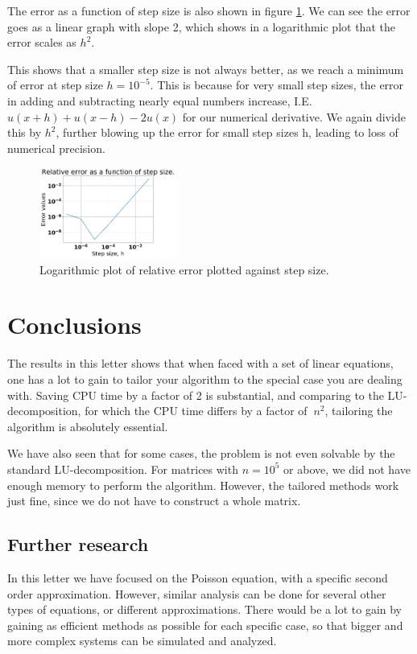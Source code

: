 \documentclass{emulateapj}
\begin{document}
The error as a function of step size is also shown in figure \ref{fig:3}. We can see the error goes as a linear graph with slope 2, which shows in a logarithmic plot that the error scales as $h^2$.

This shows that a smaller step size is not always better, as we reach a minimum of error at step size $h=10^{-5}$. This is because for very small step sizes, the error in adding and subtracting nearly equal numbers increase, I.E. $u(x+h)+u(x-h)-2u(x)$ for our numerical derivative. We again divide this by $h^2$, further blowing up the error for small step sizes h, leading to loss of numerical precision. 

\begin{figure}[H]
    \centering
    \includegraphics[width=0.4\textwidth]{images/RelativeError.png}
    \caption{Logarithmic plot of relative error plotted against step size.}
    \label{fig:3}
\end{figure}

\section{Conclusions}
\label{sec:conclusions}
The results in this letter shows that when faced with a set of linear equations, one has a lot to gain to tailor your algorithm to the special case you are dealing with. Saving CPU time by a factor of 2 is substantial, and comparing to the LU-decomposition, for which the CPU time differs by a factor of $~n^2$, tailoring the algorithm is absolutely essential.

We have also seen that for some cases, the problem is not even solvable by the standard LU-decomposition. For matrices with $n=10^5$ or above, we did not have enough memory to perform the algorithm. However, the tailored methods work just fine, since we do not have to construct a whole matrix. 

\pagebreak

\subsection{Further research}
In this letter we have focused on the Poisson equation, with a specific second order approximation. However, similar analysis can be done for several other types of equations, or different approximations. There would be a lot to gain by gaining as efficient methods as possible for each specific case, so that bigger and more complex systems can be simulated and analyzed. 
\end{document}
